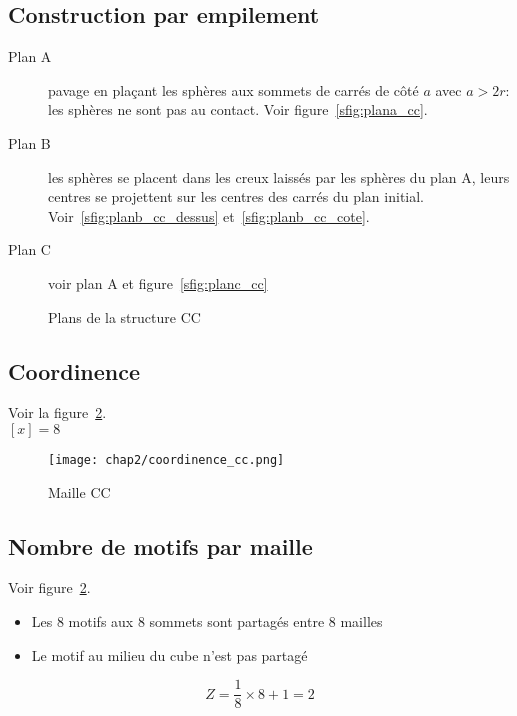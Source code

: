 \subsection{Construction par empilement}
\begin{description}
    \item[Plan A] pavage en plaçant les sphères aux sommets de carrés
        de côté $a$ avec $a>2r$: les sphères ne sont pas au contact.
        Voir figure~\ref{sfig:plana_cc}.
    \item[Plan B] les sphères se placent dans les creux laissés par 
        les sphères du plan A, leurs centres se projettent sur
        les centres des carrés du plan initial.
        Voir~\ref{sfig:planb_cc_dessus} et~\ref{sfig:planb_cc_cote}.
    \item[Plan C] voir plan A et figure~\ref{sfig:planc_cc}
\end{description}
\begin{figure}
    \qquad
    \qquad
    \qquad
    \caption{Plans de la structure CC}\label{plans_cc}
\end{figure}

\subsection{Coordinence}
Voir la figure~\ref{fig:coordinence_cc}.\\
$[x] = 8$
\begin{figure}
    \centering
    \texttt{[image: chap2/coordinence\_cc.png]}
    \caption{Maille CC}\label{fig:coordinence_cc}
\end{figure}

\subsection{Nombre de motifs par maille}
Voir figure~\ref{fig:coordinence_cc}.
\begin{itemize}
    \item Les 8 motifs aux 8 sommets sont partagés entre 8 mailles
    \item Le motif au milieu du cube n'est pas partagé
\end{itemize}
\begin{equation}
    Z = \frac{1}{8} \times 8 + 1 = 2
\end{equation}

